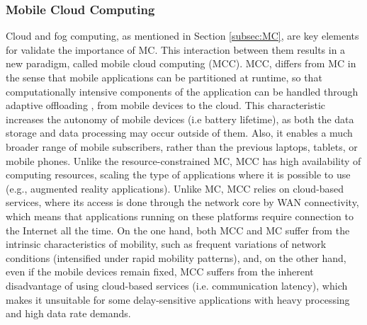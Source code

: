 \subsubsection{Mobile Cloud Computing}
Cloud and fog computing, as mentioned in Section \ref{subsec:MC}, are key elements for validate the importance of MC. This interaction between them results in a new paradigm, called mobile cloud computing (MCC). MCC, differs from MC in the sense that mobile applications can be partitioned at runtime, so that computationally intensive components of the application can be handled through adaptive offloading \cite{shiraz2013review}, from mobile devices to the cloud. This characteristic increases the autonomy of mobile devices (i.e battery lifetime), as both the data storage and data processing may occur outside of them. Also, it enables a much broader range of mobile subscribers, rather than the previous laptops, tablets, or mobile phones. Unlike the resource-constrained MC, MCC has high availability of computing resources, scaling the type of applications where it is possible to use (e.g., augmented reality applications). Unlike MC, MCC relies on cloud-based services, where its access is done through the network core by WAN connectivity, which means that applications running on these platforms require connection to the Internet all the time. On the one hand, both MCC and MC suffer from the intrinsic characteristics of mobility, such as frequent variations of network conditions (intensified under rapid mobility patterns), and, on the other hand, even if the mobile devices remain fixed, MCC suffers from the inherent disadvantage of using cloud-based services (i.e. communication latency), which makes it unsuitable for some delay-sensitive applications with heavy processing and high data rate demands.

